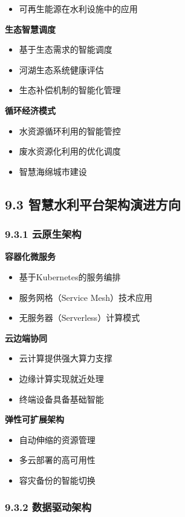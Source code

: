 \begin{itemize}
绿色低碳的水利系统设计 \item 可再生能源在水利设施中的应用 \end{itemize} \textbf{生态智慧调度} \begin{itemize} \tightlist \item 基于生态需求的智能调度 \item
河湖生态系统健康评估 \item 生态补偿机制的智能化管理 \end{itemize} \textbf{循环经济模式} \begin{itemize} \tightlist \item 水资源循环利用的智能管控 \item
废水资源化利用的优化调度 \item 智慧海绵城市建设 \end{itemize} \subsection{9.3
智慧水利平台架构演进方向}\label{ux667aux6167ux6c34ux5229ux5e73ux53f0ux67b6ux6784ux6f14ux8fdbux65b9ux5411} \subsubsection{9.3.1
云原生架构}\label{ux4e91ux539fux751fux67b6ux6784} \textbf{容器化微服务} \begin{itemize} \tightlist \item 基于Kubernetes的服务编排 \item
服务网格（Service Mesh）技术应用 \item 无服务器（Serverless）计算模式 \end{itemize} \textbf{云边端协同} \begin{itemize} \tightlist \item
云计算提供强大算力支撑 \item 边缘计算实现就近处理 \item 终端设备具备基础智能 \end{itemize} \textbf{弹性可扩展架构} \begin{itemize} \tightlist \item 自动伸缩的资源管理
\item 多云部署的高可用性 \item 容灾备份的智能切换 \end{itemize} \subsubsection{9.3.2 数据驱动架构}\label{ux6570ux636eux9a71ux52a8ux67b6ux6784}
